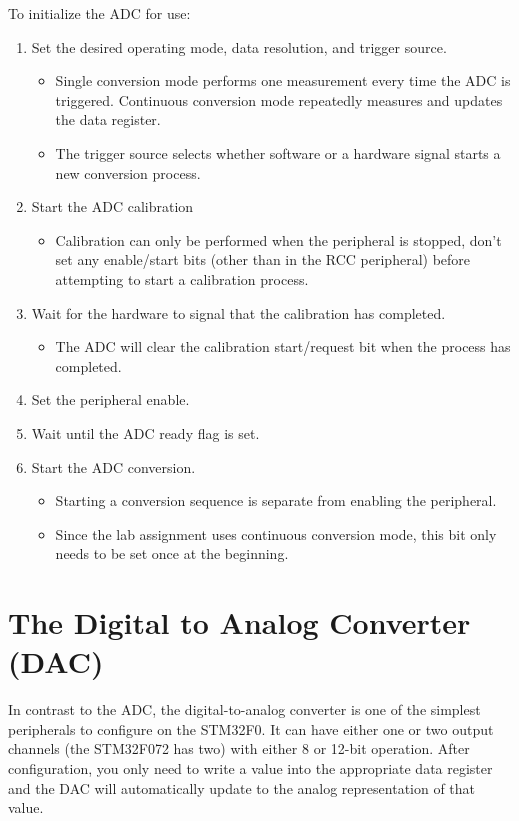\documentclass[11pt,fleqn]{book} %
\begin{document}
To initialize the ADC for use:
\begin{enumerate}
    \item Set the desired operating mode, data resolution, and trigger source. 
    \begin{itemize}
        \item Single conversion mode performs one measurement every time the ADC is triggered. Continuous conversion mode repeatedly measures and updates the data register. 
        \item The trigger source selects whether software or a hardware signal starts a new conversion process. 
    \end{itemize}
    \item Start the ADC calibration
    \begin{itemize}
        \item Calibration can only be performed when the peripheral is stopped, don't set any enable/start bits (other than in the RCC peripheral) before attempting to start a calibration process. 
    \end{itemize}
    \item Wait for the hardware to signal that the calibration has completed.
    \begin{itemize}
        \item The ADC will clear the calibration start/request bit when the process has completed. 
    \end{itemize}
    \item Set the peripheral enable.
    \item Wait until the ADC ready flag is set. 
    \item Start the ADC conversion.
    \begin{itemize}
        \item Starting a conversion sequence is separate from enabling the peripheral. 
        \item Since the lab assignment uses continuous conversion mode, this bit only needs to be set once at the beginning. 
    \end{itemize}
\end{enumerate}

\section{The Digital to Analog Converter (DAC)}
In contrast to the ADC, the digital-to-analog converter is one of the simplest peripherals to configure on the STM32F0. It can have either one or two output channels (the STM32F072 has two) with either 8 or 12-bit operation. After configuration, you only need to write a value into the appropriate data register and the DAC will automatically update to the analog representation of that value.
\end{document}
